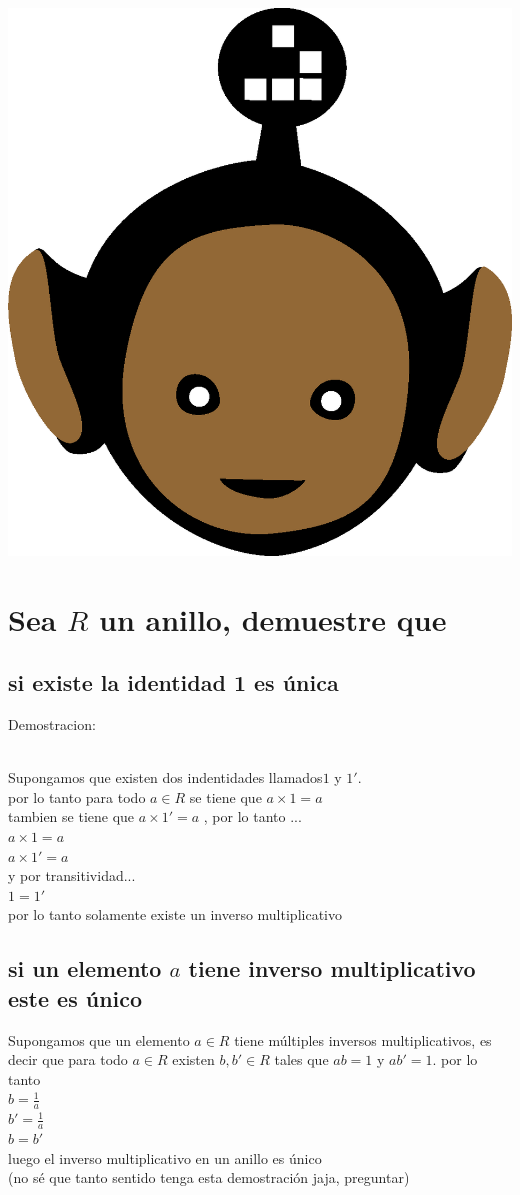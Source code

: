 \documentclass[10pt,a4paper]{article} %
\begin{document}
    \title{\rmfamily\normalfont{}}
    \author{}
    \date{\today}

    \maketitle

    \includegraphics[width=0.1\linewidth]{negro_cara.png}
    \section{Sea $ R  $ un anillo, demuestre que }
        \subsection{si existe la identidad 1 es única}
         Demostracion:

         \\ Supongamos que existen dos indentidades llamados$ 1  $  y $ 1'  $.
         \\ por lo tanto para todo $ a \in  R  $ se tiene que $ a \times 1 = a   $
         \\ tambien se tiene que $ a \times 1' = a  $ , por lo tanto ...
         \\ $ a \times 1 = a  $
         \\ $ a \times 1' = a  $
         \\ y por transitividad...
         \\ $ 1 = 1'  $
         \\ por lo tanto solamente existe un inverso multiplicativo

        \subsection{si un elemento $ a  $ tiene inverso multiplicativo este es
        único}

            Supongamos que un elemento $ a \in R  $ tiene múltiples inversos
            multiplicativos,  es decir que para todo $ a \in R  $ existen $ b,
            b' \in R$ tales que $ ab = 1  $ y $ ab' =1 $. por lo tanto
            \\ $ b = \frac{1}{a}  $
            \\ $ b' = \frac{1}{a}  $
            \\ $ b = b'  $
            \\ luego el inverso multiplicativo en un anillo es único
            \\ (no sé que tanto sentido tenga esta demostración jaja, preguntar)
\end{document}

